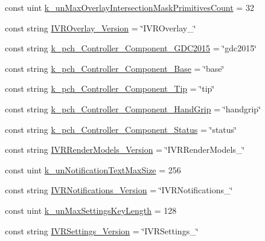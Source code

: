 \begin{DoxyCompactItemize}
\item 
const uint \mbox{\hyperlink{class_valve_1_1_v_r_1_1_open_v_r_a8ccf3aa384da44896a43669a524c97b2}{k\+\_\+un\+Max\+Overlay\+Intersection\+Mask\+Primitives\+Count}} = 32
\item 
const string \mbox{\hyperlink{class_valve_1_1_v_r_1_1_open_v_r_aa2b2658d834abd94a82700ec633e3797}{I\+V\+R\+Overlay\+\_\+\+Version}} = \char`\"{}I\+V\+R\+Overlay\+\_\char`\"{}
\item 
const string \mbox{\hyperlink{class_valve_1_1_v_r_1_1_open_v_r_a81172b980f489a130878c3e6a0f5cd21}{k\+\_\+pch\+\_\+\+Controller\+\_\+\+Component\+\_\+\+G\+D\+C2015}} = \char`\"{}gdc2015\char`\"{}
\item 
const string \mbox{\hyperlink{class_valve_1_1_v_r_1_1_open_v_r_aaaa9892f8e6f609e8a8a67ea923f2484}{k\+\_\+pch\+\_\+\+Controller\+\_\+\+Component\+\_\+\+Base}} = \char`\"{}base\char`\"{}
\item 
const string \mbox{\hyperlink{class_valve_1_1_v_r_1_1_open_v_r_a8cb2609b3a0a23b3c7e9df6384171f59}{k\+\_\+pch\+\_\+\+Controller\+\_\+\+Component\+\_\+\+Tip}} = \char`\"{}tip\char`\"{}
\item 
const string \mbox{\hyperlink{class_valve_1_1_v_r_1_1_open_v_r_a102f34216ab57a923787fc8137aa4a46}{k\+\_\+pch\+\_\+\+Controller\+\_\+\+Component\+\_\+\+Hand\+Grip}} = \char`\"{}handgrip\char`\"{}
\item 
const string \mbox{\hyperlink{class_valve_1_1_v_r_1_1_open_v_r_a8509273d5301978b42a720c433d84f21}{k\+\_\+pch\+\_\+\+Controller\+\_\+\+Component\+\_\+\+Status}} = \char`\"{}status\char`\"{}
\item 
const string \mbox{\hyperlink{class_valve_1_1_v_r_1_1_open_v_r_a1b23f2c66b887bd6b768949290a89bd5}{I\+V\+R\+Render\+Models\+\_\+\+Version}} = \char`\"{}I\+V\+R\+Render\+Models\+\_\char`\"{}
\item 
const uint \mbox{\hyperlink{class_valve_1_1_v_r_1_1_open_v_r_a8f502305cca089d435cdfd545afd7d90}{k\+\_\+un\+Notification\+Text\+Max\+Size}} = 256
\item 
const string \mbox{\hyperlink{class_valve_1_1_v_r_1_1_open_v_r_ab87745ce2389cd97f695822cc6a397d6}{I\+V\+R\+Notifications\+\_\+\+Version}} = \char`\"{}I\+V\+R\+Notifications\+\_\char`\"{}
\item 
const uint \mbox{\hyperlink{class_valve_1_1_v_r_1_1_open_v_r_ac60984a398bbc62edf8c8a21402dc581}{k\+\_\+un\+Max\+Settings\+Key\+Length}} = 128
\item 
const string \mbox{\hyperlink{class_valve_1_1_v_r_1_1_open_v_r_a8125bf10b737ffdb051e315f3fb91e1f}{I\+V\+R\+Settings\+\_\+\+Version}} = \char`\"{}I\+V\+R\+Settings\+\_\char`\"{}

\end{DoxyCompactItemize}
